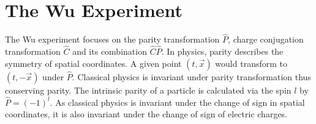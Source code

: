\chapter{The Wu Experiment}
\label{cha:wu_exp}


The Wu experiment focuses on the parity transformation $\hat P$, charge conjugation transformation $\hat C$ and its combination $\hat C\hat P$.
In physics, parity describes the symmetry of spatial coordinates.
A given point $(t, \vec x)$ would transform to $(t, -\vec x)$ under $\hat P$.
Classical physics is invariant under parity transformation thus conserving parity. %
The intrinsic parity of a particle is calculated via the spin $l$ by $ \hat P=(-1)^l$. %
As classical physics is invariant under the change of sign in spatial coordinates, it is also invariant under the change of sign of electric charges.
